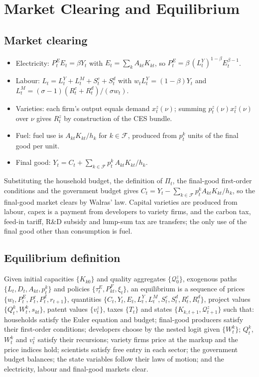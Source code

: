 \documentclass[12pt]{article}
\begin{document}
\section{Market Clearing and Equilibrium}\label{sec:eq}

\subsection{Market clearing}

\begin{itemize}
\item Electricity: $P^E_tE_t=\beta Y_t$ with $E_t=\sum_kA_{kt}K_{kt}$,
so $P^E_t=\beta\,(L^Y_t)^{1-\beta}E_t^{\beta-1}$.
\item Labour: $L_t=L^Y_t+L^M_t+S^c_t+S^d_t$ with
$w_tL^Y_t=(1-\beta)Y_t$ and $L^M_t=(\sigma-1)(R^c_t+R^d_t)/(\sigma w_t)$.
\item Varieties: each firm's output equals demand $x^z_t(\nu)$; summing
$p^z_t(\nu)x^z_t(\nu)$ over $\nu$ gives $R^z_t$ by construction of the
CES bundle.
\item Fuel: fuel use is $A_{kt}K_{kt}/h_k$ for $k\in\mathcal F$,
produced from $p^k_t$ units of the final good per unit.
\item Final good: $Y_t=C_t+\sum_{k\in\mathcal F}p^k_t\,A_{kt}K_{kt}/h_k$.
\end{itemize}
Substituting the household budget, the definition of $\Pi_t$, the
final-good first-order conditions and the government budget gives
$C_t=Y_t-\sum_{k\in\mathcal F}p^k_tA_{kt}K_{kt}/h_k$, so the final-good
market clears by Walras' law. Capital varieties are produced from
labour, capex is a payment from developers to variety firms, and the
carbon tax, feed-in tariff, R\&D subsidy and lump-sum tax are transfers;
the only use of the final good other than consumption is fuel.

\subsection{Equilibrium definition}

Given initial capacities $\{K_{k0}\}$ and quality aggregates
$\{\mathcal Q^z_0\}$, exogenous paths $\{L_t,D_t,A_{kt},p^k_t\}$ and
policies $\{\tau^E_t,P^F_{kt},\xi_t\}$, an equilibrium is a sequence of
prices $\{w_t,P^E_t,P^c_t,P^d_t,r_{t+1}\}$, quantities
$\{C_t,Y_t,E_t,L^Y_t,L^M_t,S^c_t,S^d_t,R^c_t,R^d_t\}$, project values
$\{Q^k_t,W^k_t,s_{kt}\}$, patent values $\{v^z_t\}$, taxes $\{T_t\}$ and
states $\{K_{k,t+1},\mathcal Q^z_{t+1}\}$ such that: households satisfy
the Euler equation and budget; final-good producers satisfy their
first-order conditions; developers choose by the nested logit given
$\{W^k_t\}$; $Q^k_t$, $W^k_t$ and $v^z_t$ satisfy their recursions;
variety firms price at the markup and the price indices hold; scientists
satisfy free entry in each sector; the government budget balances; the
state variables follow their laws of motion; and the electricity, labour
and final-good markets clear.
\end{document}
